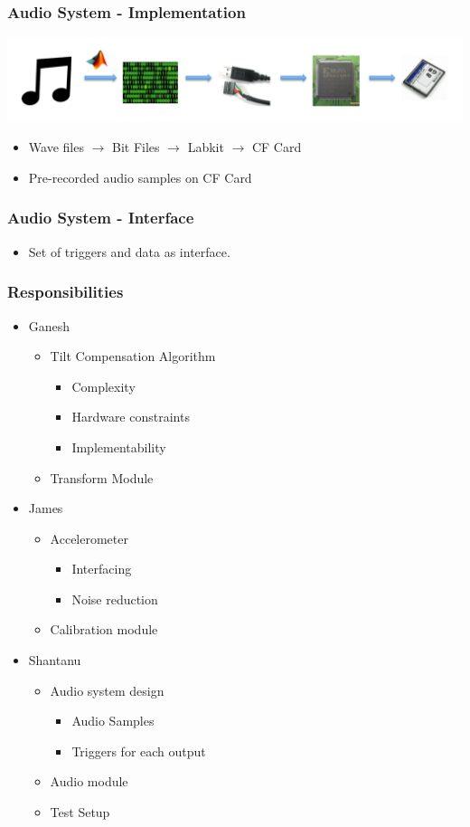 \documentclass{beamer}
\begin{document}
\begin{frame}
\frametitle{Audio System - Implementation}
\includegraphics[scale=0.24]{./img/audioimpl}
\begin{itemize}
\item Wave files $\rightarrow$ Bit Files $\rightarrow$ Labkit $\rightarrow$ CF Card
\item Pre-recorded audio samples on CF Card
\end{itemize}
\end{frame}

\begin{frame}
\frametitle{Audio System - Interface}
\begin{itemize}
\item Set of triggers and data as interface.
\end{itemize}
\end{frame}

\begin{frame}
\frametitle{Responsibilities}
\begin{itemize}
	\item{Ganesh}
	\begin{itemize}
		\item Tilt Compensation Algorithm
		\begin{itemize}
			\item Complexity
			\item Hardware constraints
			\item Implementability
		\end{itemize}
		\item Transform Module
	\end{itemize}
	\item{James}
	\begin{itemize}
		\item Accelerometer
		\begin{itemize}
			\item Interfacing
			\item Noise reduction
		\end{itemize}
		\item Calibration module
	\end{itemize}
	\item{Shantanu}
	\begin{itemize}
		\item Audio system design
		\begin{itemize}
			\item Audio Samples
			\item Triggers for each output
		\end{itemize}
		\item Audio module
		\item Test Setup
	\end{itemize}
\end{itemize}
\end{frame}
\end{document}
